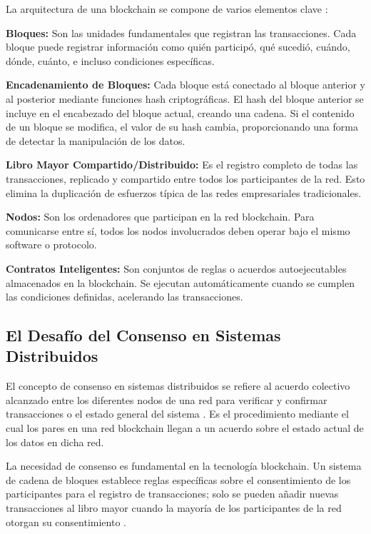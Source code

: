 \documentclass[spanish,12pt,letterpaper]{report}
\begin{document}
La arquitectura de una blockchain se compone de varios elementos clave \parencite{bartolomeo2025intro}:

\textbf{Bloques:} Son las unidades fundamentales que registran las transacciones. Cada bloque puede registrar información como quién participó, qué sucedió, cuándo, dónde, cuánto, e incluso condiciones específicas.

\textbf{Encadenamiento de Bloques:} Cada bloque está conectado al bloque anterior y al posterior mediante funciones hash criptográficas. El hash del bloque anterior se incluye en el encabezado del bloque actual, creando una cadena. Si el contenido de un bloque se modifica, el valor de su hash cambia, proporcionando una forma de detectar la manipulación de los datos.

\textbf{Libro Mayor Compartido/Distribuido:} Es el registro completo de todas las transacciones, replicado y compartido entre todos los participantes de la red. Esto elimina la duplicación de esfuerzos típica de las redes empresariales tradicionales.

\textbf{Nodos:} Son los ordenadores que participan en la red blockchain. Para comunicarse entre sí, todos los nodos involucrados deben operar bajo el mismo software o protocolo.

\textbf{Contratos Inteligentes:} Son conjuntos de reglas o acuerdos autoejecutables almacenados en la blockchain. Se ejecutan automáticamente cuando se cumplen las condiciones definidas, acelerando las transacciones.

\subsection{El Desafío del Consenso en Sistemas Distribuidos}

El concepto de consenso en sistemas distribuidos se refiere al acuerdo colectivo alcanzado entre los diferentes nodos de una red para verificar y confirmar transacciones o el estado general del sistema \parencite{crypto2025consensus}. Es el procedimiento mediante el cual los pares en una red blockchain llegan a un acuerdo sobre el estado actual de los datos en dicha red.

La necesidad de consenso es fundamental en la tecnología blockchain. Un sistema de cadena de bloques establece reglas específicas sobre el consentimiento de los participantes para el registro de transacciones; solo se pueden añadir nuevas transacciones al libro mayor cuando la mayoría de los participantes de la red otorgan su consentimiento \parencite{aws2025blockchain}.
\end{document}
